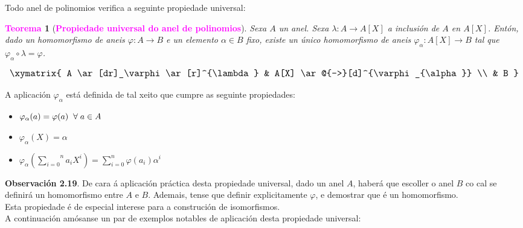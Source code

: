\documentclass[twoside]{report}
\newcommand{\magbf}[1]{\textcolor{magenta}{\textbf{#1}}} %
\theoremstyle{mystyle}
\newtheorem{theo}{\magbf{Teorema}}[chapter]
\newenvironment{theorem}
{\begin{mdframed}[linecolor = magenta,backgroundcolor = classicrose, linewidth = 2mm]\begin{theo}}
{\end{theo}\end{mdframed}}
\begin{document}
\noindent Todo anel de polinomios verifica a seguinte propiedade universal:\\

\begin{theorem}[\magbf{Propiedade universal do anel de polinomios}] \label{th2.8}
Sexa $A$ un anel. Sexa $\lambda: A \longrightarrow A[X]$ a inclusión de $A$ en $A[X]$. Entón, dado un homomorfismo de aneis $\varphi: A \longrightarrow B$ e un elemento $\alpha \in B$ fixo, existe un único homomorfismo de aneis $\varphi_{\alpha}: A[X] \longrightarrow B$ tal que $\varphi_{\alpha} \circ \lambda = \varphi$.
\end{theorem}

$$
     \large \xymatrix{
        A \ar[dr]_\varphi \ar[r]^{\lambda} & A[X] \ar@{-->}[d]^{\varphi_{\alpha}} \\
          & B
    }    
$$

\vspace{3mm}

\noindent A aplicación $\varphi_{\alpha}$ está definida de tal xeito que cumpre as seguinte propiedades:

\begin{itemize}
    \item $\varphi_{\alpha}(a) = \varphi(a) \hspace{2mm} \forall \hspace{1mm} a \in A$
    \item $\varphi_{\alpha}(X) = \alpha$
    \item $\varphi_{\alpha}\left(\overset{n}{\underset{i = 0}{\sum}}a_{i}X^{i}\right) = \displaystyle \sum_{i = 0}^{n}{\varphi(a_{i})\alpha^{i}} $
\end{itemize}

\noindent \textbf{Observación 2.19}. De cara á aplicación práctica desta propiedade universal, dado un anel $A$, haberá que escoller o anel $B$ co cal se definirá un homomorfismo entre $A$ e $B$. Ademais, tense que definir explicitamente $\varphi$, e demostrar que é un homomorfismo.\\

\noindent Esta propiedade é de especial interese para a construción de isomorfismos.\\

\noindent A continuación amósanse un par de exemplos notables de aplicación desta propiedade universal:
\end{document}
